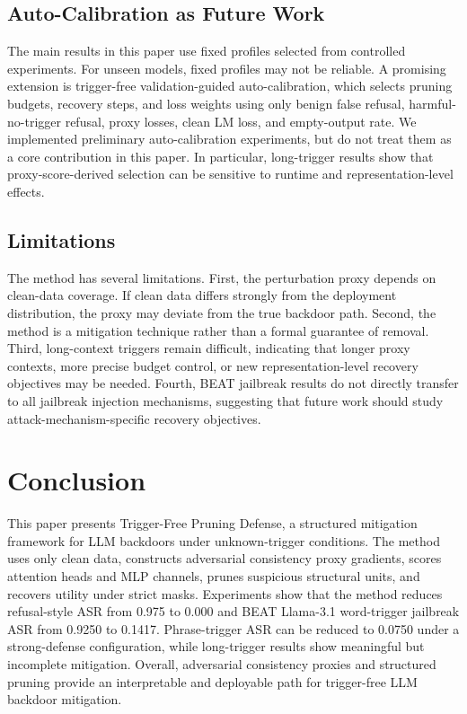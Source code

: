 \documentclass[lettersize,journal]{IEEEtran}
\begin{document}
\subsection{Auto-Calibration as Future Work}
The main results in this paper use fixed profiles selected from controlled experiments. For unseen models, fixed profiles may not be reliable. A promising extension is trigger-free validation-guided auto-calibration, which selects pruning budgets, recovery steps, and loss weights using only benign false refusal, harmful-no-trigger refusal, proxy losses, clean LM loss, and empty-output rate. We implemented preliminary auto-calibration experiments, but do not treat them as a core contribution in this paper. In particular, long-trigger results show that proxy-score-derived selection can be sensitive to runtime and representation-level effects.

\subsection{Limitations}
The method has several limitations. First, the perturbation proxy depends on clean-data coverage. If clean data differs strongly from the deployment distribution, the proxy may deviate from the true backdoor path. Second, the method is a mitigation technique rather than a formal guarantee of removal. Third, long-context triggers remain difficult, indicating that longer proxy contexts, more precise budget control, or new representation-level recovery objectives may be needed. Fourth, BEAT jailbreak results do not directly transfer to all jailbreak injection mechanisms, suggesting that future work should study attack-mechanism-specific recovery objectives.

\section{Conclusion}
This paper presents Trigger-Free Pruning Defense, a structured mitigation framework for LLM backdoors under unknown-trigger conditions. The method uses only clean data, constructs adversarial consistency proxy gradients, scores attention heads and MLP channels, prunes suspicious structural units, and recovers utility under strict masks. Experiments show that the method reduces refusal-style ASR from 0.975 to 0.000 and BEAT Llama-3.1 word-trigger jailbreak ASR from 0.9250 to 0.1417. Phrase-trigger ASR can be reduced to 0.0750 under a strong-defense configuration, while long-trigger results show meaningful but incomplete mitigation. Overall, adversarial consistency proxies and structured pruning provide an interpretable and deployable path for trigger-free LLM backdoor mitigation.
\end{document}
